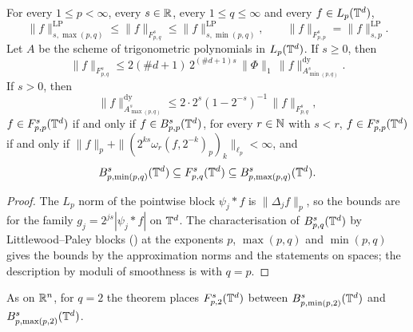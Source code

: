 \begin{theorem}[$\TL{s}{p}{p}(\T^d) = \Besov{s}{p}{p}(\T^d)$ and the Besov sandwich on the torus]
\label{thm:torus-tl-besov-sandwich}
\leanok
{}
For every $1 \leq p < \infty$, every $s \in \mathbb{R}$, every $1 \leq q \leq \infty$ and every
$f \in L_p(\mathbb{T}^d)$,
\[
  \|f\|^{\mathrm{LP}}_{s,\max(p,q)} \leq \|f\|_{F^s_{p,q}} \leq \|f\|^{\mathrm{LP}}_{s,\min(p,q)} ,
  \qquad \|f\|_{F^s_{p,p}} = \|f\|^{\mathrm{LP}}_{s,p} .
\]
Let $A$ be the scheme of trigonometric polynomials in $L_p(\mathbb{T}^d)$. If $s \geq 0$, then
\[
  \|f\|_{F^s_{p,q}} \leq 2 (\#d + 1) \, 2^{(\#d + 1) s} \, \|\Phi\|_1 \,
  \|f\|^{\mathrm{dy}}_{A^s_{\min(p,q)}} .
\]
If $s > 0$, then
\[
  \|f\|^{\mathrm{dy}}_{A^s_{\max(p,q)}} \leq 2 \cdot 2^s (1 - 2^{-s})^{-1} \, \|f\|_{F^s_{p,q}} ,
\]
$f \in F^{s}_{p,p}(\mathbb{T}^d)$ if and only if $f \in B^{s}_{p,p}(\mathbb{T}^d)$, for every $r \in \mathbb{N}$ with
$s < r$, $f \in F^{s}_{p,p}(\mathbb{T}^d)$ if and only if
$\|f\|_p + \|(2^{ks} \omega_r(f, 2^{-k})_p)_k\|_{\ell_p} < \infty$, and
\[
  B^{s}_{p,\min(p,q)}(\mathbb{T}^d) \subseteq F^{s}_{p,q}(\mathbb{T}^d)
  \subseteq B^{s}_{p,\max(p,q)}(\mathbb{T}^d) .
\]
\end{theorem}

\begin{proof}
\leanok
The $L_p$ norm of the pointwise block $\psi_j * f$ is $\|\Delta_j f\|_p$, so the bounds are
 for the family $g_j = 2^{js} |\psi_j * f|$ on $\mathbb{T}^d$. The
characterisation of $B^{s}_{p,q}(\mathbb{T}^d)$ by Littlewood--Paley blocks
() at the exponents $p$, $\max(p,q)$ and $\min(p,q)$ gives the
bounds by the approximation norms and the statements on spaces; the description by moduli of
smoothness is  with $q = p$.
\end{proof}

As on $\mathbb{R}^n$, for $q = 2$ the theorem places $F^{s}_{p,2}(\mathbb{T}^d)$ between
$B^{s}_{p,\min(p,2)}(\mathbb{T}^d)$ and $B^{s}_{p,\max(p,2)}(\mathbb{T}^d)$.

